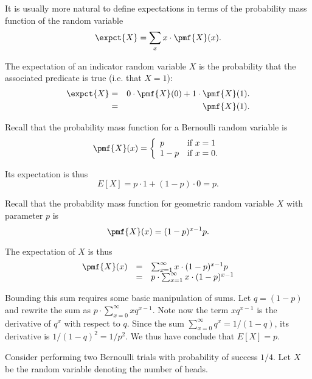 {It is usually more natural to define expectations in terms of the
probability mass function of the random variable
\[
\expct{X} = \sum_{x} x \cdot \pmf{X}(x).
\] 

\begin{example}
The expectation of an indicator random variable $X$ is
the probability that the associated predicate is true (i.e. that
$X= 1$):
\begin{eqnarray*}
\expct{X} 
& = & 0 \cdot \pmf{X}(0) + 1 \cdot \pmf{X}(1).
\\
& = & \pmf{X}(1).
\end{eqnarray*}
\end{example}

\begin{example}
Recall that the probability mass function for a Bernoulli random
variable is  
\[
\pmf{X}(x) = 
\left\{
\begin{array}{ll}
p & \mbox{if}~x = 1
\\
1-p & \mbox{if}~x = 0.
\end{array}
\right.
\]

Its expectation is thus
\[
E[X] = p \cdot 1 + (1-p) \cdot 0 = p.
\]

\end{example}


\begin{example}
Recall that the probability mass function for geometric random
variable $X$ with parameter $p$ is 
%
\[
\pmf{X}(x) = (1-p)^{x-1} p.
\]

The expectation of $X$ is thus
\[
\begin{array}{lll}
\pmf{X}(x) & = & \sum_{x = 1}^{\infty}{x \cdot (1-p)^{x-1} p}
\\
& = &  p\cdot \sum_{x = 1}^{\infty}{x \cdot (1-p)^{x-1}}
\end{array}
\]

Bounding this sum requires some basic manipulation of sums.
%
Let $q = (1-p)$ and rewrite the sum as $p \cdot \sum_{x = 0}^{\infty}{xq^{x-1}}$.
%
Note now the term $xq^{x-1}$ is the derivative of $q^{x}$ with respect
to $q$.
%
Since the sum $\sum_{x=0}^{\infty}{q^x} = 1/(1-q)$, its derivative is
$1/(1-q)^2 = 1/p^2$.
%
We thus have conclude that $E[X] = p$.
\end{example}

\begin{example}
Consider performing two Bernoulli trials with probability of success $1/4$.
Let $X$ be the random variable denoting the number of heads.


\end{example}}
